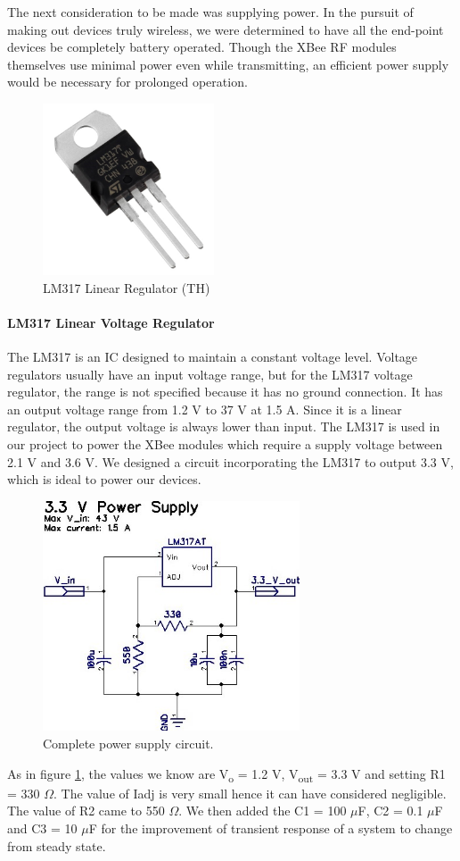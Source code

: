 \par The next consideration to be made was supplying power. In the pursuit of making out devices truly wireless, we were determined to have all the end-point devices be completely battery operated. Though the XBee RF modules themselves use minimal power even while transmitting, an efficient power supply would be necessary for prolonged operation. 
	\begin{figure}[h]
		\includegraphics[width=2in]{lm317.jpg}
		\caption{\small LM317 Linear Regulator (TH)}
	\end{figure}
	\paragraph{\normalsize LM317 Linear Voltage Regulator \hspace{1.5em}} 
	The LM317 is an IC designed to maintain a constant voltage level. Voltage regulators usually have an input voltage range, but for the LM317 voltage regulator, the range is not specified because it has no ground connection. It has an output voltage range from 1.2 V to 37 V at 1.5 A. Since it is a linear regulator, the output voltage is always lower than input. The LM317 is used in our project to power the XBee modules which require a supply voltage between 2.1 V and 3.6 V. We designed a circuit incorporating the LM317 to output 3.3 V, which is ideal to power our devices. 
	\begin{figure}[h]
		\centering
		\includegraphics[width=3in]{33vsource.jpg}
		\caption{Complete power supply circuit.}
		\label{3v_circuit}
	\end{figure}
	\par As in figure \ref{3v_circuit}, the values we know are V\textsubscript{o} = 1.2 V, V\textsubscript{out} = 3.3 V and setting R1 = 330 $\Omega$.  The value of Iadj is very small hence it can have considered negligible. The value of R2 came to 550 $\Omega$. We then added the C1 = 100 $\mu$F, C2 = 0.1 $\mu$F and C3 = 10 $\mu$F for the improvement of transient response of a system to change from steady state. 
	
